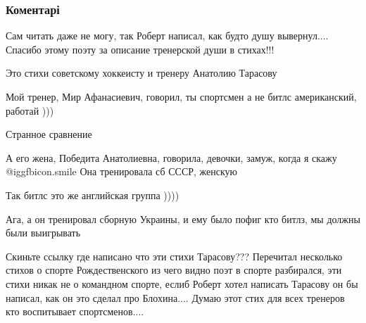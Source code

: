  
 
 
 
 
\subsubsection{Коментарі}
\label{sec:12_09_2015.fb.radionov_vladimir.1.treneru_den_fiz_i_sporta.cmt}

\begin{itemize} %
Сам читать даже не могу, так Роберт написал, как будто душу вывернул.... Спасибо этому поэту за описание тренерской души в стихах!!!

Это стихи советскому хоккеисту и тренеру Анатолию Тарасову

Мой тренер, Мир Афанасиевич, говорил, ты спортсмен а не битлс американский, работай )))

\begin{itemize} %
Странное сравнение

А его жена, Победита Анатолиевна, говорила, девочки, замуж, когда я скажу  @igg{fbicon.smile} 
Она тренировала сб СССР, женскую
\end{itemize} %

Так битлс это же английская группа ))))

\begin{itemize} %
Ага, а он тренировал сборную Украины, и ему было пофиг кто битлз, мы должны были выигрывать
\end{itemize} %


Скиньте ссылку где написано что эти стихи Тарасову??? Перечитал несколько
стихов о спорте Рождественского из чего видно поэт в спорте разбирался, эти
стихи никак не о командном спорте, еслиб Роберт хотел написать Тарасову он бы
написал, как он это сделал про Блохина.... Думаю этот стих для всех тренеров
кто воспитывает спортсменов....

\end{itemize} %
